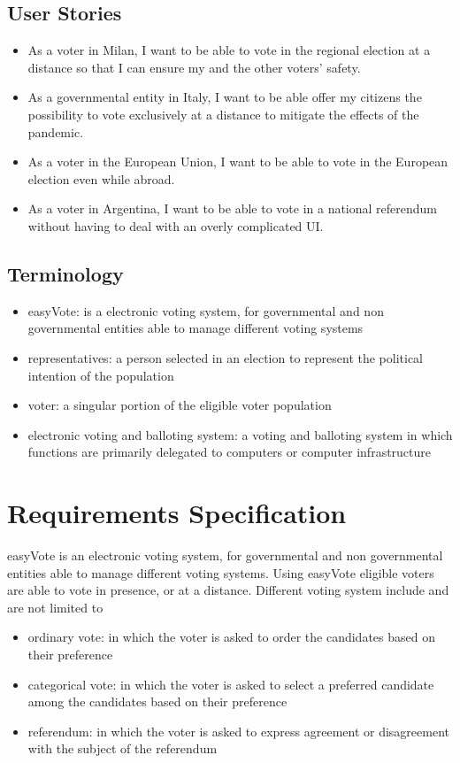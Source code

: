 \documentclass[11pt, oneside]{article}   	%
\begin{document}
\subsection{User Stories}
\begin{itemize}
\item As a voter in Milan, I want to be able to vote in the regional election at a distance so that I can ensure my and the other voters' safety.
\item As a governmental entity in Italy, I want to be able offer my citizens the possibility to vote exclusively  at a distance to mitigate the effects of the pandemic.
\item As a voter in the European Union, I want to be able to vote in the European election even while abroad.
\item As a voter in Argentina, I want to be able to vote in a national referendum without having to deal with an overly complicated UI.
\end{itemize}



\clearpage
\subsection{Terminology}
\begin{itemize}
\item easyVote: is a electronic voting system, for governmental and non governmental entities able to manage different voting systems
\item representatives: a person selected in an election to represent the political intention of the population
\item voter: a singular portion of the eligible voter population
\item electronic voting and balloting system: a voting and balloting system in which functions are primarily delegated to computers or computer infrastructure
\end{itemize}
\clearpage



\section{Requirements Specification}

easyVote is an electronic voting system, for governmental and non governmental entities able to manage different voting systems. Using easyVote eligible voters are able to vote in presence, or at a distance.
Different voting system include and are not limited to \begin{itemize}
\item ordinary vote: in which the voter is asked to order the candidates based on their preference
\item categorical vote: in which the voter is asked to select a preferred candidate among the candidates based on their preference
\item referendum: in which the voter is asked to express agreement or disagreement with the subject of the referendum 
\end{itemize}
\end{document}
